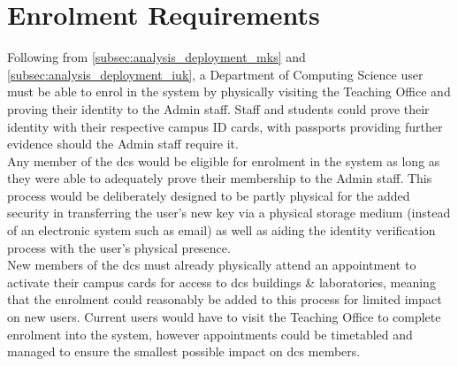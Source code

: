 \section{Enrolment Requirements}
\label{sec:analysis_enrolment}

Following from \cref{subsec:analysis_deployment_mks} and \cref{subsec:analysis_deployment_iuk}, a Department of Computing Science user must be able to enrol in the \theResServer system by physically visiting the Teaching Office and proving their identity to the Admin staff. Staff and students could prove their identity with their respective campus ID cards, with passports providing further evidence should the Admin staff require it.\\
Any member of the \acrfull{dcs} would be eligible for enrolment in the system as long as they were able to adequately prove their membership to the Admin staff. This process would be deliberately designed to be partly physical for the added security in transferring the user's new key via a physical storage medium (instead of an electronic system such as email) as well as aiding the identity verification process with the user's physical presence.\\
New members of the \acrshort{dcs} must already physically attend an appointment to activate their campus cards for access to \acrshort{dcs} buildings \& laboratories, meaning that the \theResServer enrolment could reasonably be added to this process for limited impact on new users. Current users would have to visit the Teaching Office to complete enrolment into the system, however appointments could be timetabled and managed to ensure the smallest possible impact on \acrshort{dcs} members.
